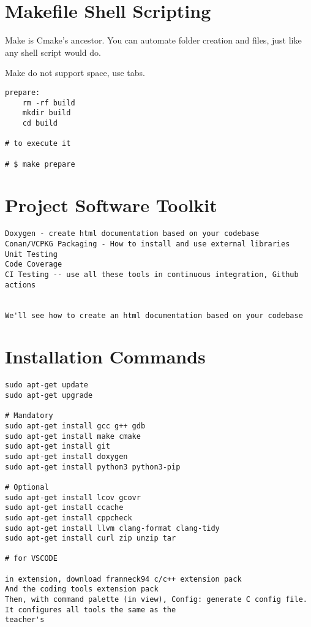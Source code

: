 \documentclass[openany]{report}
\begin{document}
\section{Makefile Shell Scripting}

Make is Cmake's ancestor. You can automate folder creation and files, just like any shell script would do. 

Make do not support space, use tabs.

\begin{verbatim}
prepare:
    rm -rf build
    mkdir build
    cd build

# to execute it

# $ make prepare
\end{verbatim}



\section{Project Software Toolkit}

\begin{verbatim}
Doxygen - create html documentation based on your codebase
Conan/VCPKG Packaging - How to install and use external libraries
Unit Testing
Code Coverage
CI Testing -- use all these tools in continuous integration, Github actions


We'll see how to create an html documentation based on your codebase
\end{verbatim}

\section{Installation Commands}

\begin{verbatim}
sudo apt-get update
sudo apt-get upgrade

# Mandatory
sudo apt-get install gcc g++ gdb
sudo apt-get install make cmake
sudo apt-get install git
sudo apt-get install doxygen
sudo apt-get install python3 python3-pip

# Optional
sudo apt-get install lcov gcovr
sudo apt-get install ccache
sudo apt-get install cppcheck
sudo apt-get install llvm clang-format clang-tidy
sudo apt-get install curl zip unzip tar

# for VSCODE

in extension, download franneck94 c/c++ extension pack
And the coding tools extension pack
Then, with command palette (in view), Config: generate C config file. It configures all tools the same as the
teacher's
\end{verbatim}
\end{document}
